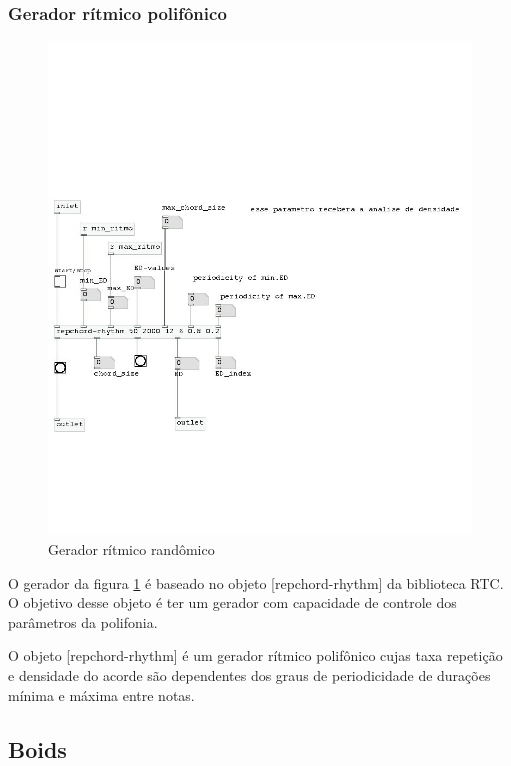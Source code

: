 \documentclass{ppgmus}
\begin{document}
\subsubsection{Gerador rítmico polifônico}


\begin{figure}
\includegraphics[scale=.6]{gerador-ritmico3}
\caption{Gerador rítmico randômico}
\label{gera-ritmico3}
\end{figure}  

O gerador da figura \ref{gera-ritmico3} é baseado no 
objeto [repchord-rhythm] da biblioteca RTC. O objetivo desse objeto é 
ter um gerador com capacidade de controle dos parâmetros da polifonia.

O objeto [repchord-rhythm] é um gerador rítmico polifônico cujas taxa repetição
e densidade do acorde são dependentes dos graus de periodicidade de durações
mínima e máxima entre notas. 

\subsection{Boids}
\end{document}
